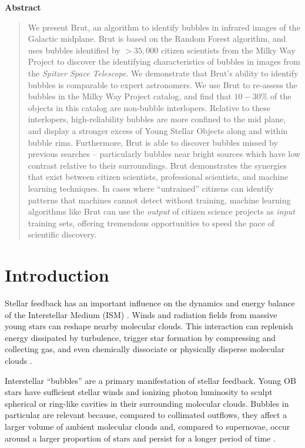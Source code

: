 \begin{center}
  \bfseries Abstract
\end{center}
 \begin{quote}
We present Brut, an algorithm to identify bubbles in infrared images of the Galactic midplane. Brut is based on the Random Forest algorithm, and uses bubbles identified by $>35,000$ citizen scientists from the Milky Way Project to discover the identifying characteristics of bubbles in images from the \textit{Spitzer Space Telescope}. We demonstrate that Brut's ability to identify bubbles is comparable to expert astronomers. We use Brut to re-assess the bubbles in the Milky Way Project catalog, and find that $10-30\%$ of the objects in this catalog are non-bubble interlopers. Relative to these interlopers, high-reliability bubbles are more confined to the mid plane, and display a stronger excess of Young Stellar Objects along and within bubble rims. Furthermore, Brut is able to discover bubbles missed by previous searches -- particularly bubbles near bright sources which have low contrast relative to their surroundings. Brut demonstrates the synergies that exist between citizen scientists, professional scientists, and machine learning techniques. In cases where ``untrained'' citizens can identify patterns that machines cannot detect without training, machine learning algorithms like Brut can use the \emph{output} of citizen science projects as \emph{input} training sets, offering tremendous opportunities to speed the pace of scientific discovery.
\end{quote}

\section{Introduction}
\label{sec:intro_ch6_brut}
Stellar feedback has an important influence on the dynamics and energy balance of the Interstellar Medium (ISM) \citep{Zinnecker07}. Winds and radiation fields from massive young stars can reshape nearby molecular clouds. This interaction can replenish energy dissipated by turbulence, trigger star formation by compressing and collecting gas, and even chemically dissociate or physically disperse molecular clouds \citep{Matzner02}.

Interstellar ``bubbles'' are a primary manifestation of stellar feedback. Young OB stars have sufficient stellar winds and ionizing photon luminosity to sculpt spherical or ring-like cavities in their surrounding molecular clouds. Bubbles in particular are relevant because, compared to collimated outflows, they affect a larger volume of ambient molecular clouds and, compared to supernovae, occur around a larger proportion of stars and persist for a longer period of time \citep{Matzner02, Arce11}.

